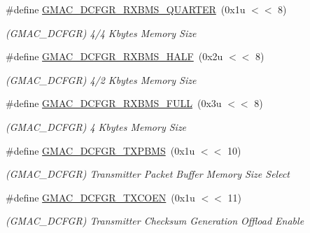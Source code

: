 \begin{DoxyCompactItemize}
\#define \mbox{\hyperlink{group__SAMV71__GMAC_gafba34868045ec08fa21e3e99c91edb6f}{G\+M\+A\+C\+\_\+\+D\+C\+F\+G\+R\+\_\+\+R\+X\+B\+M\+S\+\_\+\+Q\+U\+A\+R\+T\+ER}}~(0x1u $<$$<$ 8)
\begin{DoxyCompactList}\small\item\em (G\+M\+A\+C\+\_\+\+D\+C\+F\+GR) 4/4 Kbytes Memory Size \end{DoxyCompactList}\item 
\mbox{\label{group__SAMV71__GMAC_ga22ce8eaf9cd982892374ee2b51fddc4f}} 
\#define \mbox{\hyperlink{group__SAMV71__GMAC_ga22ce8eaf9cd982892374ee2b51fddc4f}{G\+M\+A\+C\+\_\+\+D\+C\+F\+G\+R\+\_\+\+R\+X\+B\+M\+S\+\_\+\+H\+A\+LF}}~(0x2u $<$$<$ 8)
\begin{DoxyCompactList}\small\item\em (G\+M\+A\+C\+\_\+\+D\+C\+F\+GR) 4/2 Kbytes Memory Size \end{DoxyCompactList}\item 
\mbox{\label{group__SAMV71__GMAC_ga521b3a5ff87bd4f749847584582bfe2a}} 
\#define \mbox{\hyperlink{group__SAMV71__GMAC_ga521b3a5ff87bd4f749847584582bfe2a}{G\+M\+A\+C\+\_\+\+D\+C\+F\+G\+R\+\_\+\+R\+X\+B\+M\+S\+\_\+\+F\+U\+LL}}~(0x3u $<$$<$ 8)
\begin{DoxyCompactList}\small\item\em (G\+M\+A\+C\+\_\+\+D\+C\+F\+GR) 4 Kbytes Memory Size \end{DoxyCompactList}\item 
\mbox{\label{group__SAMV71__GMAC_ga0e14fdcd2111e80d322c8ddd5c96d838}} 
\#define \mbox{\hyperlink{group__SAMV71__GMAC_ga0e14fdcd2111e80d322c8ddd5c96d838}{G\+M\+A\+C\+\_\+\+D\+C\+F\+G\+R\+\_\+\+T\+X\+P\+B\+MS}}~(0x1u $<$$<$ 10)
\begin{DoxyCompactList}\small\item\em (G\+M\+A\+C\+\_\+\+D\+C\+F\+GR) Transmitter Packet Buffer Memory Size Select \end{DoxyCompactList}\item 
\mbox{\label{group__SAMV71__GMAC_gafc756df472d0b7c3a9b8499ffad0c436}} 
\#define \mbox{\hyperlink{group__SAMV71__GMAC_gafc756df472d0b7c3a9b8499ffad0c436}{G\+M\+A\+C\+\_\+\+D\+C\+F\+G\+R\+\_\+\+T\+X\+C\+O\+EN}}~(0x1u $<$$<$ 11)
\begin{DoxyCompactList}\small\item\em (G\+M\+A\+C\+\_\+\+D\+C\+F\+GR) Transmitter Checksum Generation Offload Enable \end{DoxyCompactList}\item 
$$
\end{DoxyCompactItemize}
